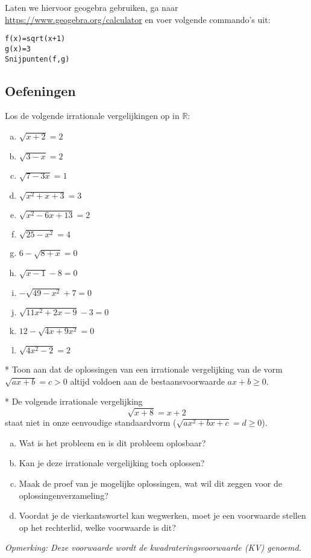 \documentclass[12pt,twoside]{article}
\begin{document}
Laten we hiervoor geogebra gebruiken, ga naar \url{https://www.geogebra.org/calculator} en voer volgende commando's uit:
\begin{verbatim}
f(x)=sqrt(x+1)
g(x)=3
Snijpunten(f,g)
\end{verbatim}

\needspace{3cm}
\subsection{Oefeningen}

\begin{oefening}
Los de volgende irrationale vergelijkingen op in $\mathbb{R}$:
\begin{multicols}{2}
\begin{enumerate}[(a)]
  \item $\sqrt{x+2}=2$
  \item $\sqrt{3-x}=2$
  \item $\sqrt{7-3x}=1$
  \item $\sqrt{x^2+x+3}=3$
  \item $\sqrt{x^2-6x+13}=2$
  \item $\sqrt{25-x^2}=4$
  \item $6-\sqrt{8+x}=0$
  \item $\sqrt{x-1}-8=0$
  \item $-\sqrt{49-x^2}+7=0$
  \item $\sqrt{11x^2+2x-9}-3=0$
  \item $12-\sqrt{4x+9x^2}=0$
  \item $\sqrt{4x^2-2}=2$
\end{enumerate}
\end{multicols}
\end{oefening}

\begin{oefening}* Toon aan dat de oplossingen van een irrationale vergelijking van de vorm $\sqrt{ax+b}=c>0$ altijd voldoen aan de bestaansvoorwaarde $ax+b\geq0$.
\end{oefening}

\begin{oefening}*
De volgende irrationale vergelijking
$$\sqrt{x+8}=x+2$$
staat niet in onze eenvoudige standaardvorm ($\sqrt{ax^2+bx+c}=d\geq0$).
\begin{enumerate}[(a)]
  \item Wat is het probleem en is dit probleem oplosbaar?
  \item Kan je deze irrationale vergelijking toch oplossen?
  \item Maak de proef van je mogelijke oplossingen, wat wil dit zeggen voor de oplossingenverzameling?
  \item Voordat je de vierkantswortel kan wegwerken, moet je een voorwaarde stellen op het rechterlid, welke voorwaarde is dit?
\end{enumerate}
{\em Opmerking: Deze voorwaarde wordt de kwadrateringsvoorwaarde (KV) genoemd.}
\end{oefening}
\end{document}
